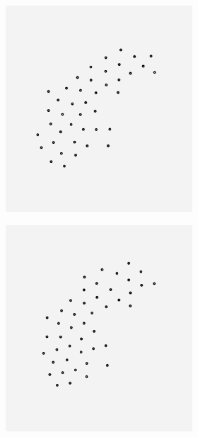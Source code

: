 \begin{figure}[!h]
\begin{subfigure}[b]{1.0\linewidth}
\begin{subfigure}[b]{0.30\linewidth}
  	\vspace{2ex}
  \end{subfigure}%
  \begin{subfigure}[b]{0.30\linewidth}
  	\centering
  	\includegraphics[width=0.9\linewidth]{Pictures/bp10_2_sweden} 
  	\vspace{2ex}
  \end{subfigure}
  \begin{subfigure}[b]{0.30\linewidth}
  	\centering
  	\includegraphics[width=0.9\linewidth]{Pictures/bp5_2_sweden} 
  	\vspace{2ex}
  \end{subfigure}
\end{subfigure}
\end{figure}

